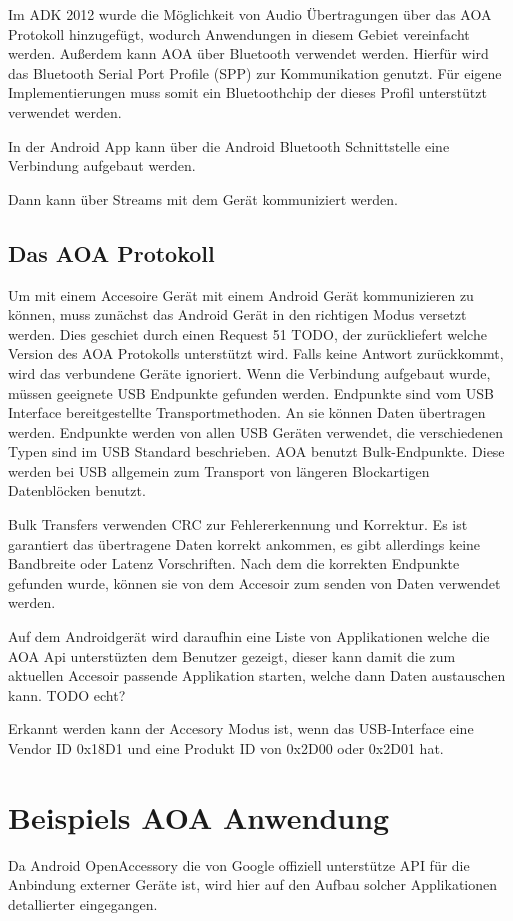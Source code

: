 \documentclass[12pt,journal,compsoc]{IEEEtran}
\begin{document}
Im ADK 2012 wurde die Möglichkeit von Audio Übertragungen über das AOA Protokoll hinzugefügt, wodurch Anwendungen in diesem Gebiet vereinfacht werden.
Außerdem kann AOA über Bluetooth verwendet werden. Hierfür wird das Bluetooth Serial Port Profile (SPP) zur Kommunikation genutzt. Für eigene Implementierungen muss somit ein Bluetoothchip der dieses Profil unterstützt verwendet werden.


In der Android App kann über die Android Bluetooth Schnittstelle eine Verbindung aufgebaut werden.

Dann kann über Streams mit dem Gerät kommuniziert werden.

\subsection{Das AOA Protokoll}
Um mit einem Accesoire Gerät mit einem Android Gerät kommunizieren zu können, muss zunächst das Android Gerät in den richtigen Modus versetzt werden.
Dies geschiet durch einen Request 51 TODO, der zurückliefert welche Version des AOA Protokolls unterstützt wird. Falls keine Antwort zurückkommt, wird das verbundene Geräte ignoriert.
Wenn die Verbindung aufgebaut wurde, müssen geeignete USB Endpunkte gefunden werden. Endpunkte sind vom USB Interface bereitgestellte Transportmethoden. An sie können Daten übertragen werden.
Endpunkte werden von allen USB Geräten verwendet, die verschiedenen Typen sind im USB Standard beschrieben.
AOA benutzt Bulk-Endpunkte. Diese werden bei USB allgemein zum Transport von längeren Blockartigen Datenblöcken benutzt.

Bulk Transfers verwenden CRC zur Fehlererkennung und Korrektur. Es ist garantiert das übertragene Daten korrekt ankommen, es gibt allerdings keine Bandbreite oder Latenz Vorschriften.
\cite{usbbulk}
Nach dem die korrekten Endpunkte gefunden wurde, können sie von dem Accesoir zum senden von Daten verwendet werden.

Auf dem Androidgerät wird daraufhin eine Liste von Applikationen welche die AOA Api unterstüzten dem Benutzer gezeigt, dieser kann damit die zum aktuellen Accesoir passende Applikation starten, welche dann Daten austauschen kann. TODO echt?


Erkannt werden kann der Accesory Modus ist, wenn das USB-Interface eine Vendor ID 0x18D1 und eine Produkt ID von 0x2D00 oder 0x2D01 hat. 

\section{Beispiels AOA Anwendung}
Da Android OpenAccessory die von Google offiziell unterstütze API für die Anbindung externer Geräte ist, wird hier auf den Aufbau solcher Applikationen detallierter eingegangen.
\end{document}
